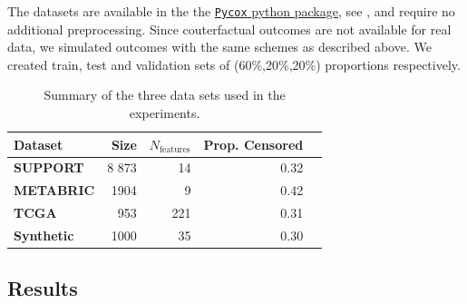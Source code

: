 \documentclass[12pt]{article}
\theoremstyle{plain}
\theoremstyle{definition}
\theoremstyle{remark}
\begin{document}
The datasets are available in the the \href{https://github.com/havakv/pycox}{\texttt{Pycox} python package}, see \cite{kvamme2019continuous}, and require no additional preprocessing. Since couterfactual outcomes are not available for real data, we simulated outcomes with the same schemes as described above. We created train, test and validation sets of (60\%,20\%,20\%) proportions respectively.

\begin{table}[ht]\centering
\caption{Summary of the three data sets used in the experiments.}\label{data}
\begin{tabular}{lrrrr}\toprule \textbf{Dataset}
&\textbf{Size} &\textbf{$N_{\text{features}}$} &\textbf{Prop. Censored} \\\midrule
\textbf{SUPPORT} &8 873 &14 &0.32 \\
\textbf{METABRIC} &1904 &9 &0.42 \\
\textbf{TCGA} &953 &221 &0.31 \\
\textbf{Synthetic} &1000 & 35 & 0.30 \\
\bottomrule
\end{tabular}
\end{table}


\subsection{Results}
\end{document}
